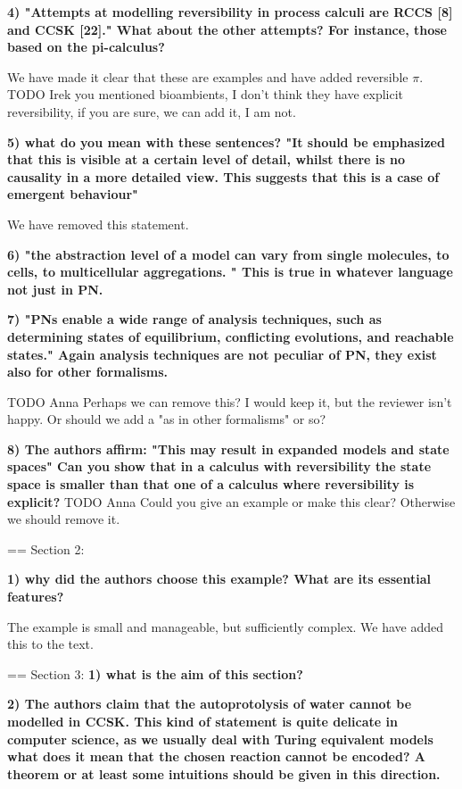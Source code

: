 \documentclass{article}
\begin{document}
\textbf{4) "Attempts at modelling reversibility in process calculi are RCCS [8] and CCSK [22]." What about the other attempts? For instance, those based on the pi-calculus?}

We have made it clear that these are examples and have added reversible $\pi$. TODO Irek you mentioned bioambients, I don't think they have explicit reversibility, if you are sure, we can add it, I am not.

\textbf{5) what do you mean with these sentences? "It should be emphasized that this is visible at a certain level of detail, whilst there is no causality in a more detailed view. This suggests that this is a case of emergent behaviour"}

We have removed this statement.

\textbf{6) "the abstraction level of a model can vary from single molecules, to cells, to multicellular aggregations. "
This is true in whatever language not just in PN.}

\textbf{7) "PNs enable a wide range of analysis techniques, such as determining states of equilibrium, conflicting evolutions, and reachable states."
Again analysis techniques are not peculiar of PN, they exist also for other formalisms.}

TODO Anna Perhaps we can remove this? I would keep it, but the reviewer isn't happy. Or should we add a "as in other formalisms" or so?

\textbf{8) The authors affirm: 
"This may result in expanded models and state spaces" Can you show that in a calculus with reversibility the state space is smaller than that one of a calculus where reversibility is explicit?}
TODO Anna Could you give an example or make this clear? Otherwise we should remove it.

== Section 2: 

\textbf{1) why did the authors choose this example? What are its essential features?}

The example is small and manageable, but sufficiently complex. We have added this to the text.


== Section 3:
\textbf{1) what is the aim of this section?}

\textbf{2) The authors claim that the autoprotolysis of water cannot be modelled in CCSK.
This kind of statement is quite delicate in computer science, as we usually deal with Turing equivalent models what does it mean that the chosen reaction cannot be encoded? A theorem or at least some intuitions should be given in this direction.}
\end{document}
